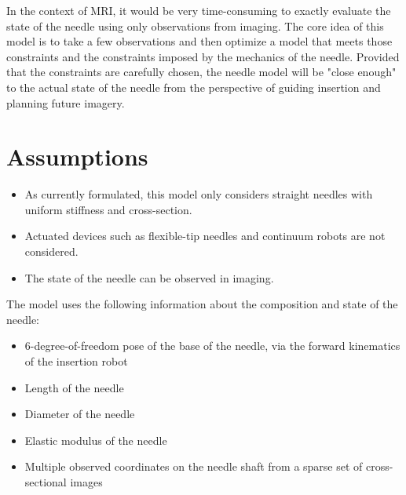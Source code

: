 In the context of MRI, it would be very time-consuming to exactly evaluate the state of the needle using only observations from imaging. The core idea of this model is to take a few observations and then optimize a model that meets those constraints and the constraints imposed by the mechanics of the needle. Provided that the constraints are carefully chosen, the needle model will be "close enough" to the actual state of the needle from the perspective of guiding insertion and planning future imagery.

\section{Assumptions}
\begin{itemize}
\item As currently formulated, this model only considers straight needles with uniform stiffness and cross-section.

\item Actuated devices such as flexible-tip needles and continuum robots are not considered.

\item The state of the needle can be observed in imaging.

\end{itemize}

The model uses the following information about the composition and state of the needle:
\begin{itemize}
\item 6-degree-of-freedom pose of the base of the needle, via the forward kinematics of the insertion robot
\item Length of the needle
\item Diameter of the needle
\item Elastic modulus of the needle
\item Multiple observed coordinates on the needle shaft from a sparse set of cross-sectional images
\end{itemize}

